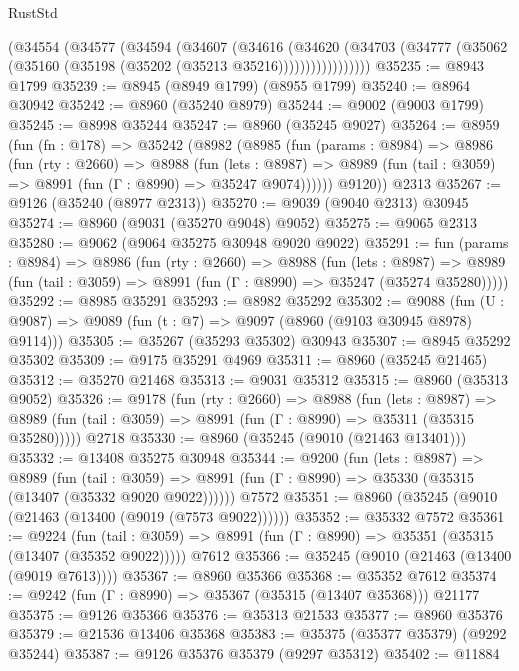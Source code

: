 \begin{lexlean}{RustStd}
\begin{coremodule}
            (@34554
              (@34577
                (@34594
                  (@34607
                    (@34616
                      (@34620
                        (@34703
                          (@34777 (@35062 (@35160 (@35198 (@35202 (@35213 @35216)))))))))))))))))
@35235 := @8943 @1799
@35239 := @8945 (@8949 @1799) (@8955 @1799)
@35240 := @8964 @30942
@35242 := @8960 (@35240 @8979)
@35244 := @9002 (@9003 @1799)
@35245 := @8998 @35244
@35247 := @8960 (@35245 @9027)
@35264 := @8959
    (fun (fn : @178) =>
    @35242
      (@8982
        (@8985
          (fun (params : @8984) =>
          @8986
            (fun (rty : @2660) =>
            @8988
              (fun (lets : @8987) =>
              @8989 (fun (tail : @3059) => @8991 (fun (Γ : @8990) => @35247 @9074))))))
        @9120))
    @2313
@35267 := @9126 (@35240 (@8977 @2313))
@35270 := @9039 (@9040 @2313) @30945
@35274 := @8960 (@9031 (@35270 @9048) @9052)
@35275 := @9065 @2313
@35280 := @9062 (@9064 @35275 @30948 @9020 @9022)
@35291 := fun (params : @8984) =>
  @8986
    (fun (rty : @2660) =>
    @8988
      (fun (lets : @8987) =>
      @8989 (fun (tail : @3059) => @8991 (fun (Γ : @8990) => @35247 (@35274 @35280)))))
@35292 := @8985 @35291
@35293 := @8982 @35292
@35302 := @9088
    (fun (U : @9087) => @9089 (fun (t : @7) => @9097 (@8960 (@9103 @30945 @8978) @9114)))
@35305 := @35267 (@35293 @35302) @30943
@35307 := @8945 @35292 @35302
@35309 := @9175 @35291 @4969
@35311 := @8960 (@35245 @21465)
@35312 := @35270 @21468
@35313 := @9031 @35312
@35315 := @8960 (@35313 @9052)
@35326 := @9178
    (fun (rty : @2660) =>
    @8988
      (fun (lets : @8987) =>
      @8989 (fun (tail : @3059) => @8991 (fun (Γ : @8990) => @35311 (@35315 @35280)))))
    @2718
@35330 := @8960 (@35245 (@9010 (@21463 @13401)))
@35332 := @13408 @35275 @30948
@35344 := @9200
    (fun (lets : @8987) =>
    @8989
      (fun (tail : @3059) =>
      @8991 (fun (Γ : @8990) => @35330 (@35315 (@13407 (@35332 @9020 @9022))))))
    @7572
@35351 := @8960 (@35245 (@9010 (@21463 (@13400 (@9019 (@7573 @9022))))))
@35352 := @35332 @7572
@35361 := @9224
    (fun (tail : @3059) => @8991 (fun (Γ : @8990) => @35351 (@35315 (@13407 (@35352 @9022)))))
    @7612
@35366 := @35245 (@9010 (@21463 (@13400 (@9019 @7613))))
@35367 := @8960 @35366
@35368 := @35352 @7612
@35374 := @9242 (fun (Γ : @8990) => @35367 (@35315 (@13407 @35368))) @21177
@35375 := @9126 @35366
@35376 := @35313 @21533
@35377 := @8960 @35376
@35379 := @21536 @13406 @35368
@35383 := @35375 (@35377 @35379) (@9292 @35244)
@35387 := @9126 @35376 @35379 (@9297 @35312)
@35402 := @11884

\end{coremodule}
\end{lexlean}
